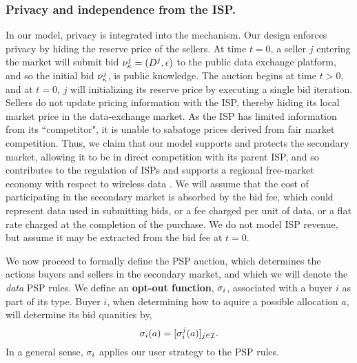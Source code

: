 \subsubsection{Privacy and independence from the ISP.}
In our model, privacy is integrated into the mechanism. Our design enforces
privacy by hiding the reserve price of the sellers. At time
$t=0$, a seller $j$ entering the market will
submit bid $\nu_\kappa^j =(D^j, \epsilon)$ to the public data exchange
platform, and so the initial bid $\nu_\kappa^j$, is public knowledge. 
The auction
begins at time $t>0$, and at $t=0$, $j$ will
initializing its reserve price by executing a single bid iteration.
Sellers do not update pricing information with the ISP, thereby hiding
its local market price in the data-exchange market. As the ISP has limited
information from its ``competitor", it is unable to sabatoge prices derived
from fair market competition.
Thus, we claim that our model supports and protects the secondary market, allowing it
to be in direct competition with its parent ISP, and so contributes to the
regulation of ISPs \cite{fedbill} and supports a regional free-market economy
with respect to wireless data \cite{cabill}.
We will assume that the cost of participating in the secondary market is
absorbed by the bid fee, which could represent data used in submitting bids, or
a fee charged per unit of data, or a flat rate charged at the completion of the
purchase. We do not model ISP revenue, but assume it may be extracted from the
bid fee at $t=0$.

We now proceed to formally define the PSP auction, which determines the actions 
buyers and sellers in the secondary market, and which we will denote the \emph{data}
PSP rules. 
We define an \textbf{opt-out function}, $\sigma_i$, associated with a buyer $i$ as
part of its type. Buyer $i$, when determining how to aquire a possible allocation $a$,
will determine its bid quanities by,
\begin{equation}\label{opt-out}
    \sigma_i(a) = [\sigma_i^j(a)]_{j\in\mathcal{I}}.
\end{equation}
In a general sense, $\sigma_i$ applies our user strategy to the PSP rules.

